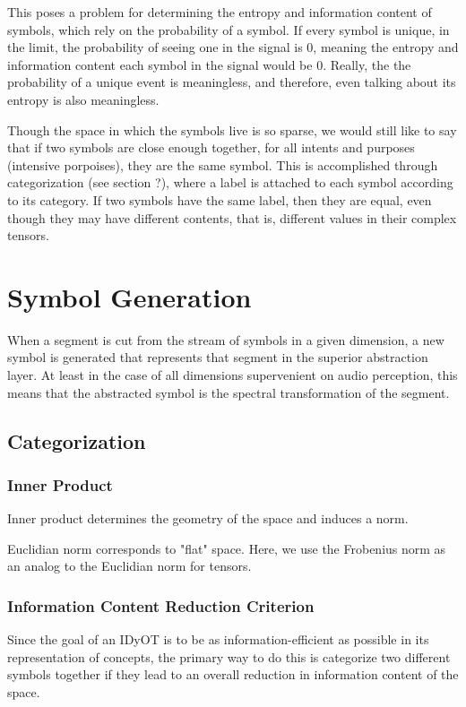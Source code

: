 \documentclass[runningheads]{llncs}
\begin{document}
This poses a problem for determining the entropy and information content of symbols, which rely on the probability of a symbol.  If every symbol is unique, in the limit, the probability of seeing one in the signal is 0, meaning the entropy and information content each symbol in the signal would be 0. Really, the the probability of a unique event is meaningless, and therefore, even talking about its entropy is also meaningless.  

Though the space in which the symbols live is so sparse, we would still like to say that if two symbols are close enough together, for all intents and purposes (intensive porpoises), they are the same symbol.  This is accomplished through categorization (see section ?), where a label is attached to each symbol according to its category.  If two symbols have the same label, then they are equal, even though they may have different contents, that is, different values in their complex tensors.

\section{Symbol Generation}
When a segment is cut from the stream of symbols in a given dimension, a new symbol is generated that represents that segment in the superior abstraction layer.  At least in the case of all dimensions supervenient on audio perception, this means that the abstracted symbol is the spectral transformation of the segment.


\subsection{Categorization}

\subsubsection{Inner Product}
Inner product determines the geometry of the space and induces a norm.

Euclidian norm corresponds to "flat" space.  Here, we use the Frobenius norm as an analog to the Euclidian norm for tensors.

\subsubsection{Information Content Reduction Criterion} 
Since the goal of an IDyOT is to be as information-efficient as possible in its representation of concepts, the primary way to do this is categorize two different symbols together if they lead to an overall reduction in information content of the space.
\end{document}
